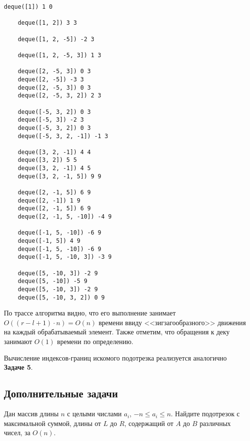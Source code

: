 \begin{solution}
    \leavevmode\vspace{1pt}
    

    \begin{lstlisting}[title={Трассировочный вывод алгоритма}]
    deque([1]) 1 0

    deque([1, 2]) 3 3

    deque([1, 2, -5]) -2 3

    deque([1, 2, -5, 3]) 1 3

    deque([2, -5, 3]) 0 3
    deque([2, -5]) -3 3
    deque([2, -5, 3]) 0 3
    deque([2, -5, 3, 2]) 2 3

    deque([-5, 3, 2]) 0 3
    deque([-5, 3]) -2 3
    deque([-5, 3, 2]) 0 3
    deque([-5, 3, 2, -1]) -1 3

    deque([3, 2, -1]) 4 4
    deque([3, 2]) 5 5
    deque([3, 2, -1]) 4 5
    deque([3, 2, -1, 5]) 9 9

    deque([2, -1, 5]) 6 9
    deque([2, -1]) 1 9
    deque([2, -1, 5]) 6 9
    deque([2, -1, 5, -10]) -4 9

    deque([-1, 5, -10]) -6 9
    deque([-1, 5]) 4 9
    deque([-1, 5, -10]) -6 9
    deque([-1, 5, -10, 3]) -3 9

    deque([5, -10, 3]) -2 9
    deque([5, -10]) -5 9
    deque([5, -10, 3]) -2 9
    deque([5, -10, 3, 2]) 0 9
    \end{lstlisting}

    По трассе алгоритма видно, что его выполнение занимает \( O((r - l + 1) \cdot n) = O(n) \) времени ввиду
    <<зигзагообразного>> движения на каждый обрабатываемый элемент. Также отметим, что обращения к деку занимают \( O(1) \) времени по определению.

    Вычисление индексов-границ искомого подотрезка реализуется аналогично \textbf{Задаче 5}.
\end{solution}


\subsection*{Дополнительные задачи}

\begin{problem}
    Дан массив длины $n$ с целыми числами $a_i$, $-n \leq a_i \leq n$. Найдите подотрезок с максимальной суммой, длины от $L$ до $R$, содержащий от $A$ до $B$ различных чисел, за $O(n)$.
\end{problem}

